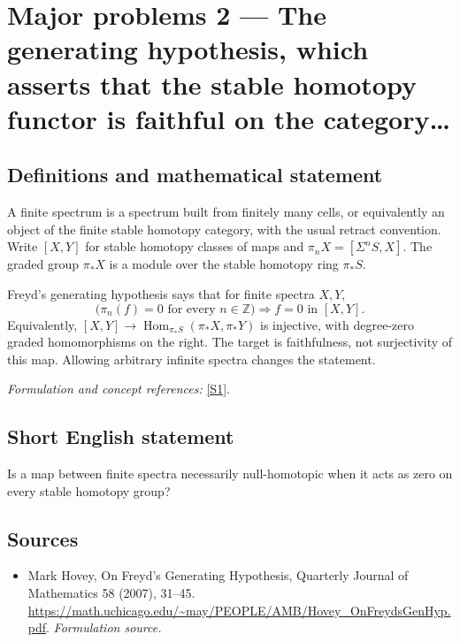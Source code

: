 \documentclass[11pt]{article}
\begin{document}
\section*{\texorpdfstring{Major problems 2 — The generating hypothesis, which asserts that the stable homotopy functor is faithful on the category…}{Major problems 2 — The generating hypothesis, which asserts that the stable homotopy functor is faithful on the category…}}\label{statement}
\subsection{Definitions and mathematical statement}
A finite spectrum is a spectrum built from finitely many cells, or equivalently an object of the finite stable homotopy category, with the usual retract convention. Write $[X,Y]$ for stable homotopy classes of maps and $\pi_nX=[\Sigma^nS,X]$. The graded group $\pi_*X$ is a module over the stable homotopy ring $\pi_*S$.

Freyd's generating hypothesis says that for finite spectra $X,Y$,
\[
 \bigl(\pi_n(f)=0\text{ for every }n\in{\mathbb{Z}}\bigr)
                  \Longrightarrow f=0\text{ in }[X,Y].
\]
Equivalently, $[X,Y]\to\operatorname{Hom}_{\pi_*S}(\pi_*X,\pi_*Y)$ is injective, with degree-zero graded homomorphisms on the right. The target is faithfulness, not surjectivity of this map. Allowing arbitrary infinite spectra changes the statement.
\par\smallskip\textit{Formulation and concept references:} \href{https://math.uchicago.edu/~may/PEOPLE/AMB/Hovey_OnFreydsGenHyp.pdf}{[S1]}.

\subsection{Short English statement}
Is a map between finite spectra necessarily null-homotopic when it acts as zero on every stable homotopy group?
\subsection{Sources}
\begin{itemize}
\item[S1]Mark Hovey, On Freyd's Generating Hypothesis, Quarterly Journal of Mathematics 58 (2007), 31–45.
\url{https://math.uchicago.edu/~may/PEOPLE/AMB/Hovey_OnFreydsGenHyp.pdf}.
\textit{Formulation source.}
\end{itemize}
\end{document}
